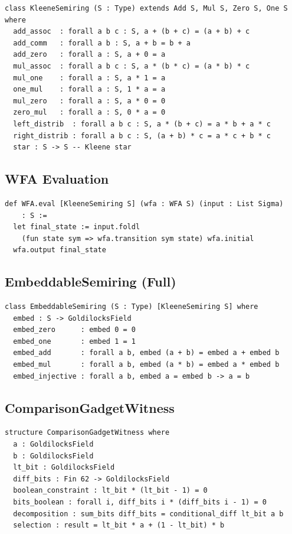\documentclass[11pt]{article}
\begin{document}
\begin{lstlisting}[language=Lean4,caption={Semiring typeclass (Spectacles/Semiring/Basic.lean).}]
class KleeneSemiring (S : Type) extends Add S, Mul S, Zero S, One S where
  add_assoc  : forall a b c : S, a + (b + c) = (a + b) + c
  add_comm   : forall a b : S, a + b = b + a
  add_zero   : forall a : S, a + 0 = a
  mul_assoc  : forall a b c : S, a * (b * c) = (a * b) * c
  mul_one    : forall a : S, a * 1 = a
  one_mul    : forall a : S, 1 * a = a
  mul_zero   : forall a : S, a * 0 = 0
  zero_mul   : forall a : S, 0 * a = 0
  left_distrib  : forall a b c : S, a * (b + c) = a * b + a * c
  right_distrib : forall a b c : S, (a + b) * c = a * c + b * c
  star : S -> S -- Kleene star
\end{lstlisting}

\subsection{WFA Evaluation}

\begin{lstlisting}[language=Lean4,caption={WFA evaluation (Spectacles/WFA/Evaluation.lean).}]
def WFA.eval [KleeneSemiring S] (wfa : WFA S) (input : List Sigma)
    : S :=
  let final_state := input.foldl
    (fun state sym => wfa.transition sym state) wfa.initial
  wfa.output final_state
\end{lstlisting}

\subsection{EmbeddableSemiring (Full)}

\begin{lstlisting}[language=Lean4,caption={Full EmbeddableSemiring typeclass.}]
class EmbeddableSemiring (S : Type) [KleeneSemiring S] where
  embed : S -> GoldilocksField
  embed_zero      : embed 0 = 0
  embed_one       : embed 1 = 1
  embed_add       : forall a b, embed (a + b) = embed a + embed b
  embed_mul       : forall a b, embed (a * b) = embed a * embed b
  embed_injective : forall a b, embed a = embed b -> a = b
\end{lstlisting}

\subsection{ComparisonGadgetWitness}

\begin{lstlisting}[language=Lean4,caption={ComparisonGadgetWitness structure.}]
structure ComparisonGadgetWitness where
  a : GoldilocksField
  b : GoldilocksField
  lt_bit : GoldilocksField
  diff_bits : Fin 62 -> GoldilocksField
  boolean_constraint : lt_bit * (lt_bit - 1) = 0
  bits_boolean : forall i, diff_bits i * (diff_bits i - 1) = 0
  decomposition : sum_bits diff_bits = conditional_diff lt_bit a b
  selection : result = lt_bit * a + (1 - lt_bit) * b
\end{lstlisting}
\end{document}
